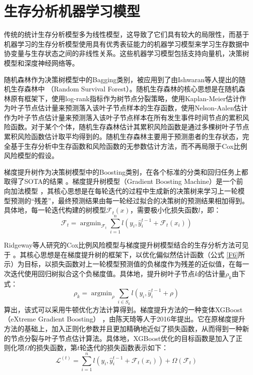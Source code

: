 \section{生存分析机器学习模型}

传统的统计生存分析模型多为线性模型，这导致了它们具有较大的局限性，而基于机器学习的生存分析模型使用具有优秀表征能力的机器学习模型来学习生存数据中协变量与生存状态之间的非线性关系。这些机器学习模型包括支持向量机，决策树模型和深度神经网络等。

随机森林作为决策树模型中的Bagging类别，被应用到了由Ishwaran等人提出的随机生存森林中 （Random Survival Forest）。随机生存森林的核心思想是在随机森林原有框架下，使用log-rank指标作为树节点分裂策略，使用Kaplan-Meier估计作为叶子节点估计量来预测落入该叶子节点样本的生存函数，使用Nelson-Aalen估计作为叶子节点估计量来预测落入该叶子节点样本在所有发生事件时间节点的累积风险函数。对于某个个体，随机生存森林估计其累积风险函数是通过多棵树叶子节点累积风险函数估计取平均得到的。随机生存森林主要用于预测患者的生存状态，完全基于生存分析中生存函数和风险函数的无参数估计方法，而不再局限于Cox比例风险模型的假设。

梯度提升树作为决策树模型中的Boosting类别，在各个标准的分类和回归任务上都取得了SOTA的结果 。梯度提升树模型（Gradient Boosting Machine）是一个前向加法模型 ，其核心思想是在每轮迭代的过程中生成新的决策树来学习上一轮模型预测的“残差”，最终预测结果由每一轮经过拟合的决策树的预测结果相加得到。具体地，每一轮迭代构建的树模型$\mathcal{F}_t (x)$，需要极小化损失函数$l$，即：
\begin{equation}
\mathcal{F}_t = \mathop{\arg\min}_{\mathcal{F}_t} \sum_{i=1}^n l(y_i, \hat{y}_i^{t-1} + \mathcal{F}_t(x_i)) \label{F9}
\end{equation}

Ridgeway等人研究的Cox比例风险模型与梯度提升树模型结合的生存分析方法可见于 。其核心思想是在梯度提升树的框架下，以优化偏似然估计函数（公式 \eqref{F6}所示）为目标，以损失函数对上一轮模型预测值的负梯度作为残差的近似值，在每一次迭代使用回归树拟合这个负梯度值。具体地，提升树叶子节点$k$的估计量$\rho_k$由下式：
\begin{equation}
\rho_k = \mathop{\arg\min}_{\rho} \sum_{i\in S_k} l(y_i, \hat{y}_i^{t-1} + \rho) \label{F10}
\end{equation}算出，该式可以采用牛顿优化方法计算得到。梯度提升方法的一种变体XGBoost（eXtreme Gradient Boosting） ，由陈天琦等人于2016年提出。它在原梯度提升方法的基础上，加入正则化参数并且更加精确地近似了损失函数，从而得到一种新的节点分裂与叶子节点估计算法。具体地，XGBoost优化的目标函数是加入了正则化项$\Omega$的损失函数，第$t$轮迭代的损失函数表示如下： 
\begin{equation}
\mathcal{L}^{(t)} = \sum_{i=1}^n l(y_i, \hat{y}_i^{t-1} + \mathcal{F}_t(x_i)) + \Omega(\mathcal{F}_t) \label{F11}
\end{equation}

